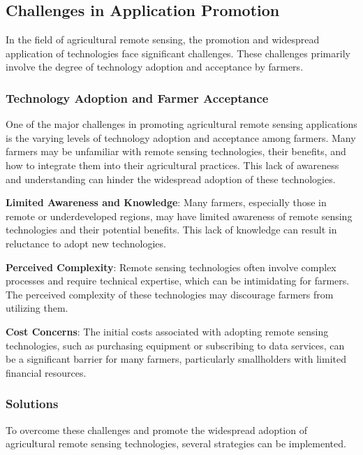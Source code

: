 
\subsection{Challenges in Application Promotion}

In the field of agricultural remote sensing, the promotion and widespread application of technologies face significant challenges. These challenges primarily involve the degree of technology adoption and acceptance by farmers.

\subsubsection{Technology Adoption and Farmer Acceptance}

One of the major challenges in promoting agricultural remote sensing applications is the varying levels of technology adoption and acceptance among farmers. Many farmers may be unfamiliar with remote sensing technologies, their benefits, and how to integrate them into their agricultural practices. This lack of awareness and understanding can hinder the widespread adoption of these technologies.

\textbf{Limited Awareness and Knowledge}:
Many farmers, especially those in remote or underdeveloped regions, may have limited awareness of remote sensing technologies and their potential benefits. This lack of knowledge can result in reluctance to adopt new technologies.

\textbf{Perceived Complexity}:
Remote sensing technologies often involve complex processes and require technical expertise, which can be intimidating for farmers. The perceived complexity of these technologies may discourage farmers from utilizing them.

\textbf{Cost Concerns}:
The initial costs associated with adopting remote sensing technologies, such as purchasing equipment or subscribing to data services, can be a significant barrier for many farmers, particularly smallholders with limited financial resources.\cite{sahooHyperspectralRemoteSensing2015}

\subsubsection{Solutions}

To overcome these challenges and promote the widespread adoption of agricultural remote sensing technologies, several strategies can be implemented.

